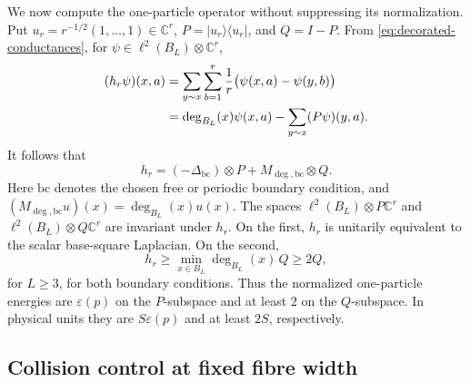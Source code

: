\documentclass[11pt]{article}
\numberwithin{equation}{section}
\theoremstyle{remark}
\newcommand{\1}{\mathbf 1}
\begin{document}
We now compute the one-particle operator without suppressing its
normalization.  Put
\(u_r=r^{-1/2}(1,\ldots,1)\in\mathbb C^r\),
\(P=|u_r\rangle\langle u_r|\), and \(Q=I-P\).  From
\eqref{eq:decorated-conductances}, for
\(\psi\in\ell^2(B_L)\otimes\mathbb C^r\),
\begin{align}
 (h_r\psi)(x,a)
 &=\sum_{y\sim x}\sum_{b=1}^r\frac1r
   \bigl(\psi(x,a)-\psi(y,b)\bigr)\notag\\
 &=\deg_{B_L}(x)\psi(x,a)
   -\sum_{y\sim x}(P\psi)(y,a).
 \label{eq:decorated-one-particle-action}
\end{align}
It follows that
\begin{equation}
 h_r=(-\Delta_{\mathrm{bc}})\otimes P
     +M_{\deg,\mathrm{bc}}\otimes Q.
 \label{eq:acoustic-optical-split}
\end{equation}
Here \(\mathrm{bc}\) denotes the chosen free or periodic boundary
condition, and
\((M_{\deg,\mathrm{bc}}u)(x)=\deg_{B_L}(x)u(x)\).
The spaces \(\ell^2(B_L)\otimes P\mathbb C^r\) and
\(\ell^2(B_L)\otimes Q\mathbb C^r\) are invariant under \(h_r\).  On the
first, \(h_r\) is unitarily equivalent to the scalar base-square
Laplacian.  On the second,
\begin{equation}
 h_r\geq \min_{x\in B_L}\deg_{B_L}(x)\,Q\geq2Q,
 \label{eq:optical-gap-two}
\end{equation}
for \(L\geq3\), for both boundary conditions.  Thus the normalized
one-particle energies are \(\varepsilon(p)\) on the \(P\)-subspace and at
least \(2\) on the \(Q\)-subspace.  In physical units they are
\(S\varepsilon(p)\) and at least \(2S\), respectively.

\subsection{Collision control at fixed fibre width}
\label{subsec:decorated-collision}
\end{document}
